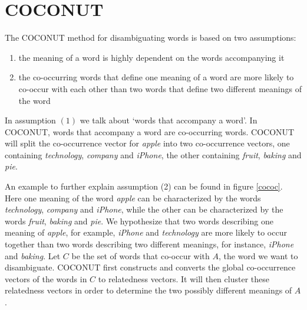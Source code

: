 \documentclass[11pt]{article}
\begin{document}
\section{COCONUT}
\label{anouk}
The COCONUT method for disambiguating words is based on two assumptions: 
\begin{enumerate}
\item the meaning of a word is highly dependent on the words accompanying it
\item the co-occurring words that define one meaning of a word are more likely to co-occur with each other than two words that define two different meanings of the word
\end{enumerate}
In assumption $(1)$ we talk about `words that accompany a word'. In COCONUT, words that accompany a word are co-occurring words. COCONUT will split the co-occurrence vector for \textit{apple} into two co-occurrence vectors, one containing \textit{technology}, \textit{company} and \textit{iPhone}, the other containing \textit{fruit}, \textit{baking} and \textit{pie}. 

An example to further explain assumption (2) can be found in figure \ref{cococ}. Here one meaning of the word \textit{apple} can be characterized by the words \textit{technology}, \textit{company} and \textit{iPhone}, while the other can be characterized by the words \textit{fruit}, \textit{baking} and \textit{pie}. We hypothesize that two words describing one meaning of \textit{apple}, for example, \textit{iPhone} and \textit{technology} are more likely to occur together than two words describing two different meanings, for instance, \textit{iPhone} and \textit{baking}.
Let $C$ be the set of words that co-occur with $A$, the word we want to disambiguate. COCONUT first constructs and converts the global co-occurrence vectors of the words in $C$ to relatedness vectors. It will then cluster these relatedness vectors in order to determine the two possibly different meanings of $A$. 
\end{document}
